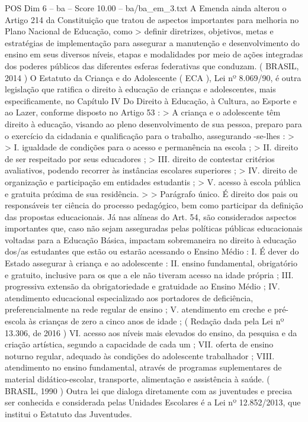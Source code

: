 \begin{textsample}{POS Dim 6 – ba – Score 10.00 – ba/ba\_em\_3.txt}
A Emenda ainda alterou o Artigo 214 da Constituição que tratou de aspectos importantes para melhoria no Plano Nacional de Educação, como > definir diretrizes, objetivos, metas e estratégias de implementação para assegurar a manutenção e desenvolvimento do ensino em seus diversos níveis, etapas e modalidades por meio de ações integradas dos poderes públicos das diferentes esferas federativas que conduzam. ( BRASIL, 2014 ) O Estatuto da Criança e do Adolescente ( ECA ), Lei nº 8.069/90, é outra legislação que ratifica o direito à educação de crianças e adolescentes, mais especificamente, no Capítulo IV Do Direito à Educação, à Cultura, ao Esporte e ao Lazer, conforme disposto no Artigo 53 : > A criança e o adolescente têm direito à educação, visando ao pleno desenvolvimento de sua pessoa, preparo para o exercício da cidadania e qualificação para o trabalho, assegurando -se-lhes : > > I. igualdade de condições para o acesso e permanência na escola ; > II. direito de ser respeitado por seus educadores ; > III. direito de contestar critérios avaliativos, podendo recorrer às instâncias escolares superiores ; > IV. direito de organização e participação em entidades estudantis ; > V. acesso à escola pública e gratuita próxima de sua residência. > > Parágrafo único.
É direito dos pais ou responsáveis ter ciência do processo pedagógico, bem como participar da definição das propostas educacionais.
Já nas alíneas do Art. 54, são considerados aspectos importantes que, caso não sejam asseguradas pelas políticas públicas educacionais voltadas para a Educação Básica, impactam sobremaneira no direito à educação dos/as estudantes que estão ou estarão acessando o Ensino Médio : I.
É dever do Estado assegurar à criança e ao adolescente : II. ensino fundamental, obrigatório e gratuito, inclusive para os que a ele não tiveram acesso na idade própria ; III. progressiva extensão da obrigatoriedade e gratuidade ao Ensino Médio ; IV. atendimento educacional especializado aos portadores de deficiência, preferencialmente na rede regular de ensino ; V. atendimento em creche e pré-escola às crianças de zero a cinco anos de idade ; ( Redação dada pela Lei nº 13.306, de 2016 ) VI. acesso aos níveis mais elevados do ensino, da pesquisa e da criação artística, segundo a capacidade de cada um ; VII. oferta de ensino noturno regular, adequado às condições do adolescente trabalhador ; VIII. atendimento no ensino fundamental, através de programas suplementares de material didático-escolar, transporte, alimentação e assistência à saúde. ( BRASIL, 1990 ) Outra lei que dialoga diretamente com as juventudes e precisa ser conhecida e considerada pelas Unidades Escolares é a Lei nº 12.852/2013, que institui o Estatuto das Juventudes.

\end{textsample}
